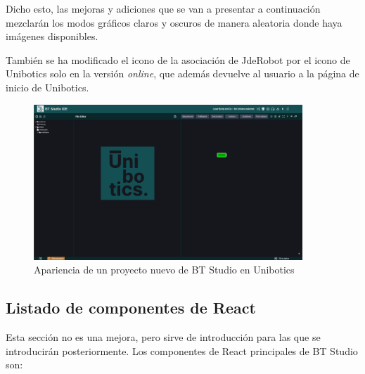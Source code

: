 Dicho esto, las mejoras y adiciones que se van a presentar a continuación mezclarán los modos gráficos claros y oscuros de manera aleatoria donde haya imágenes disponibles.

También se ha modificado el icono de la asociación de JdeRobot por el icono de Unibotics solo en la versión \textit{online}, que además devuelve al usuario a la página de inicio de Unibotics.

\begin{figure}[H]
    \centering
    \includegraphics[width=0.9\textwidth]{figures/bt-avances/bt-unib.png}
    \caption{Apariencia de un proyecto nuevo de BT Studio en Unibotics}
    \label{fig:bt-unib}
\end{figure}

\subsection{Listado de componentes de React}

Esta sección no es una mejora, pero sirve de introducción para las que se introducirán posteriormente. Los componentes de React principales de BT Studio son:

